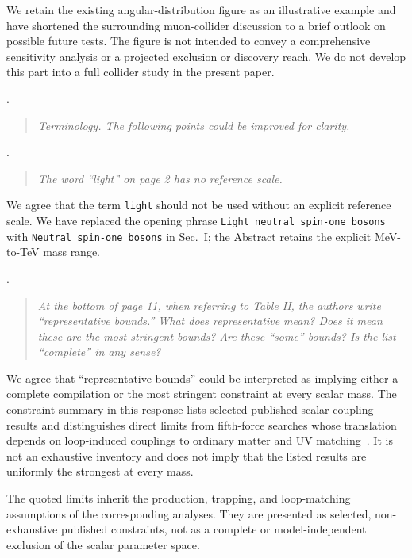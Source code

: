 \documentclass[12pt,a4paper]{article}
\begin{document}
We retain the existing angular-distribution figure as an illustrative example and have shortened the surrounding muon-collider discussion to a brief outlook on possible future tests. The figure is not intended to convey a comprehensive sensitivity analysis or a projected exclusion or discovery reach. We do not develop this part into a full collider study in the present paper.

\medskip
{}. \begin{quote}\itshape
Terminology. The following points could be improved for clarity.
\end{quote}

\medskip
{}. \begin{quote}\itshape
The word ``light'' on page 2 has no reference scale.
\end{quote}

We agree that the term \texttt{light} should not be used without an explicit reference scale. We have replaced the opening phrase \texttt{Light neutral spin-one bosons} with \texttt{Neutral spin-one bosons} in Sec.~I; the Abstract retains the explicit MeV-to-TeV mass range.

\medskip
{}. \begin{quote}\itshape
At the bottom of page 11, when referring to Table II, the authors write ``representative bounds.'' What does representative mean? Does it mean these are the most stringent bounds? Are these ``some'' bounds? Is the list ``complete'' in any sense?
\end{quote}

We agree that ``representative bounds'' could be interpreted as implying either a complete compilation or the most stringent constraint at every scalar mass. The constraint summary in this response lists selected published scalar-coupling results and distinguishes direct limits from fifth-force searches whose translation depends on loop-induced couplings to ordinary matter and UV matching~\cite{Liu:2025zuz,Fiorillo:2026wso,Caputo:2021rux,Hoskins:1985tn,Kapner:2006si,Blakemore:2021zna}. It is not an exhaustive inventory and does not imply that the listed results are uniformly the strongest at every mass.

The quoted limits inherit the production, trapping, and loop-matching assumptions of the corresponding analyses. They are presented as selected, non-exhaustive published constraints, not as a complete or model-independent exclusion of the scalar parameter space.
\end{document}
